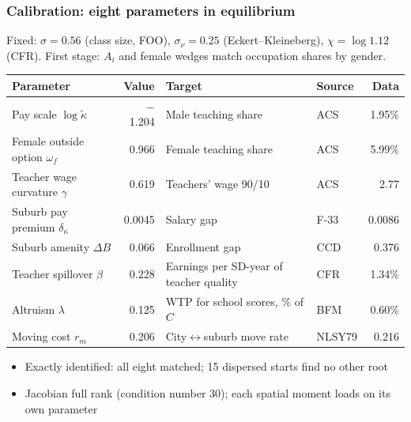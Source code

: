 \documentclass[11pt,hyperref={bookmarks=false},aspectratio=169]{beamer}
\begin{document}
\begin{frame}
\frametitle{Calibration: eight parameters in equilibrium}
\small
Fixed: $\sigma=0.56$ (class size, FOO), $\sigma_\nu=0.25$ (Eckert--Kleineberg),
$\chi=\log 1.12$ (CFR). First stage: $A_i$ and female wedges match occupation shares by gender.\par
\medskip
\centering
\footnotesize
\renewcommand{\arraystretch}{1.15}
\begin{tabular}{@{}lrllr@{}}
\toprule
Parameter & Value & Target & Source & Data \\
\midrule
Pay scale $\log\tilde\kappa$ & $-$1.204 & Male teaching share & ACS & 1.95\% \\
Female outside option $\omega_f$ & 0.966 & Female teaching share & ACS & 5.99\% \\
Teacher wage curvature $\gamma$ & 0.619 & Teachers' wage 90/10 & ACS & 2.77 \\
Suburb pay premium $\delta_\kappa$ & 0.0045 & Salary gap & F-33 & 0.0086 \\
Suburb amenity $\Delta B$ & 0.066 & Enrollment gap & CCD & 0.376 \\
Teacher spillover $\beta$ & 0.228 & Earnings per SD-year of teacher quality & CFR & 1.34\% \\
Altruism $\lambda$ & 0.125 & WTP for school scores, \% of $C$ & BFM & 0.60\% \\
Moving cost $r_m$ & 0.206 & City$\leftrightarrow$suburb move rate & NLSY79 & 0.216 \\
\bottomrule
\end{tabular}\par
\medskip
\raggedright
\small
\begin{itemize}
  \item Exactly identified: all eight matched; 15 dispersed starts find no other root
  \item Jacobian full rank (condition number 30); each spatial moment loads on its own parameter
\end{itemize}
\end{frame}
\end{document}
